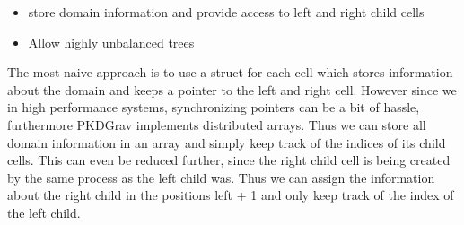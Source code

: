 \documentclass[]{article}
\begin{document}
\begin{itemize}
	\item store domain information and provide access to left and right child cells
	\item Allow highly unbalanced trees
\end{itemize}

The most naive approach is to use a struct for each cell which stores information about the domain and keeps a pointer to the left and right cell. However since we in high performance systems, synchronizing pointers can be a bit of hassle, furthermore PKDGrav implements distributed arrays. Thus we can store all domain information in an array and simply keep track of the indices of its child cells. This can even be reduced further, since the right child cell is being created by the same process as the left child was. Thus we can assign the information about the right child in the positions left + 1 and only keep track of the index of the left child.
\end{document}
